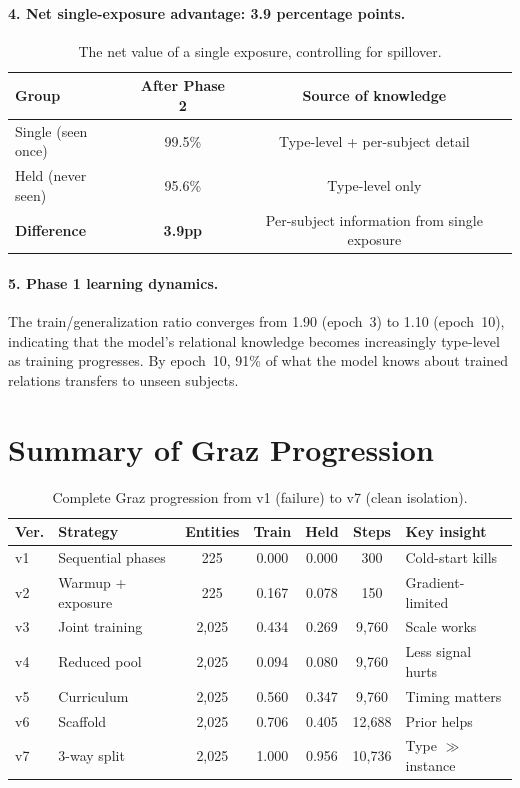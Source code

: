 \documentclass[11pt]{article}
\begin{document}
\paragraph{4. Net single-exposure advantage: 3.9 percentage points.}

\begin{table}[h]
\centering
\caption{The net value of a single exposure, controlling for spillover.}
\begin{tabular}{lcc}
\toprule
Group & After Phase 2 & Source of knowledge \\
\midrule
Single (seen once) & 99.5\% & Type-level + per-subject detail \\
Held (never seen) & 95.6\% & Type-level only \\
\textbf{Difference} & \textbf{3.9pp} & Per-subject information from single exposure \\
\bottomrule
\end{tabular}
\end{table}

\paragraph{5. Phase 1 learning dynamics.}
The train/generalization ratio converges from 1.90 (epoch~3) to 1.10 (epoch~10),
indicating that the model's relational knowledge becomes increasingly type-level as
training progresses.  By epoch~10, 91\% of what the model knows about trained relations
transfers to unseen subjects.

\section{Summary of Graz Progression}
\label{sec:summary}

\begin{table}[h]
\centering
\caption{Complete Graz progression from v1 (failure) to v7 (clean isolation).}
\label{tab:all_versions}
\begin{tabular}{llccccl}
\toprule
Ver. & Strategy & Entities & Train & Held & Steps & Key insight \\
\midrule
v1 & Sequential phases & 225 & 0.000 & 0.000 & 300 & Cold-start kills \\
v2 & Warmup + exposure & 225 & 0.167 & 0.078 & 150 & Gradient-limited \\
v3 & Joint training & 2,025 & 0.434 & 0.269 & 9,760 & Scale works \\
v4 & Reduced pool & 2,025 & 0.094 & 0.080 & 9,760 & Less signal hurts \\
v5 & Curriculum & 2,025 & 0.560 & 0.347 & 9,760 & Timing matters \\
v6 & Scaffold & 2,025 & 0.706 & 0.405 & 12,688 & Prior helps \\
v7 & 3-way split & 2,025 & 1.000 & 0.956 & 10,736 & Type $\gg$ instance \\
\bottomrule
\end{tabular}
\end{table}
\end{document}

